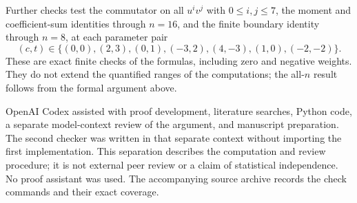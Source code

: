 \documentclass[11pt]{article}
\begin{document}
Further checks test the commutator on all $u^iv^j$ with $0\leq i,j\leq7$,
the moment and coefficient-sum identities through $n=16$, and the finite
boundary identity through $n=8$, at each parameter pair
\[
 (c,t)\in\{(0,0),(2,3),(0,1),(-3,2),(4,-3),(1,0),(-2,-2)\}.
\]
These are exact finite checks of the formulas, including zero and negative
weights. They do not extend the quantified ranges of the computations;
the all-$n$ result follows from the formal argument above.

OpenAI Codex assisted with proof development, literature searches, Python
code, a separate model-context review of the argument, and manuscript
preparation. The second checker was written in that separate context
without importing the first implementation. This separation describes
the computation and review procedure; it is not external peer review or
a claim of statistical independence. No proof assistant was used. The
accompanying source archive records the check commands and their exact
coverage.



\end{document}
